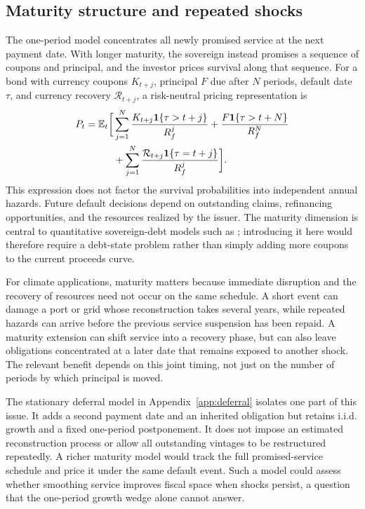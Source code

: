 \subsection{Maturity structure and repeated shocks}\label{app:maturity}
The one-period model concentrates all newly promised service at the next payment date. With longer maturity, the sovereign instead promises a sequence of coupons and principal, and the investor prices survival along that sequence. For a bond with currency coupons $K_{t+j}$, principal $F$ due after $N$ periods, default date $\tau$, and currency recovery $\mathcal R_{t+j}$, a risk-neutral pricing representation is
\begin{align}\label{eq:maturity_price}
 P_t=\mathbb E_t\bigg[&\sum_{j=1}^{N}\frac{K_{t+j}\mathbf 1\{\tau>t+j\}}{R_f^j}
 +\frac{F\mathbf 1\{\tau>t+N\}}{R_f^N}\\
 &+\sum_{j=1}^{N}\frac{\mathcal R_{t+j}\mathbf 1\{\tau=t+j\}}{R_f^j}\bigg].\nonumber
\end{align}
This expression does not factor the survival probabilities into independent annual hazards. Future default decisions depend on outstanding claims, refinancing opportunities, and the resources realized by the issuer. The maturity dimension is central to quantitative sovereign-debt models such as \textcite{ChatterjeeEyigungor2012}; introducing it here would therefore require a debt-state problem rather than simply adding more coupons to the current proceeds curve.

For climate applications, maturity matters because immediate disruption and the recovery of resources need not occur on the same schedule. A short event can damage a port or grid whose reconstruction takes several years, while repeated hazards can arrive before the previous service suspension has been repaid. A maturity extension can shift service into a recovery phase, but can also leave obligations concentrated at a later date that remains exposed to another shock. The relevant benefit depends on this joint timing, not just on the number of periods by which principal is moved.

The stationary deferral model in Appendix~\ref{app:deferral} isolates one part of this issue. It adds a second payment date and an inherited obligation but retains i.i.d. growth and a fixed one-period postponement. It does not impose an estimated reconstruction process or allow all outstanding vintages to be restructured repeatedly. A richer maturity model would track the full promised-service schedule and price it under the same default event. Such a model could assess whether smoothing service improves fiscal space when shocks persist, a question that the one-period growth wedge alone cannot answer.

